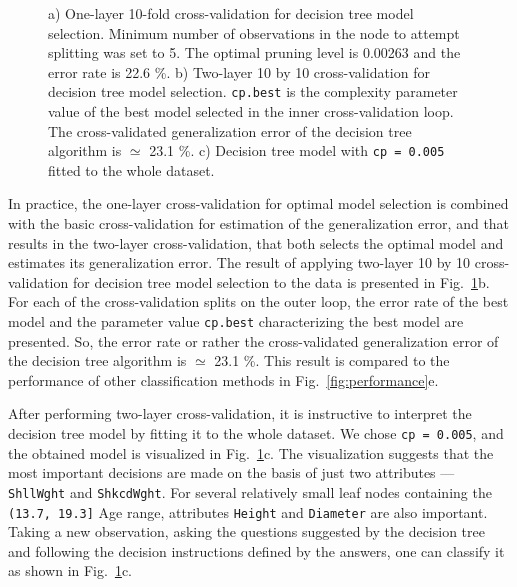 \documentclass[10pt, paper=a4]{article}
\begin{document}
\begin{figure}[h!]
\begin{minipage}{0.99\textwidth}
  \end{minipage} \vfill
  \cprotect\caption{a) One-layer 10-fold cross-validation for decision
    tree model selection.  Minimum number of observations in the node
    to attempt splitting was set to 5.  The optimal pruning level is
    0.00263 and the error rate is 22.6 \%.  b) Two-layer 10 by 10
    cross-validation for decision tree model selection.
    \verb|cp.best| is the complexity parameter value of the best model
    selected in the inner cross-validation loop.  The cross-validated
    generalization error of the decision tree algorithm is $\simeq$
    23.1 \%.  c) Decision tree model with \verb|cp = 0.005| fitted to
    the whole dataset.}
  \label{fig:decision_trees}
\end{figure}

In practice, the one-layer cross-validation for optimal model
selection is combined with the basic cross-validation for estimation
of the generalization error, and that results in the two-layer
cross-validation, that both selects the optimal model and estimates
its generalization error.  The result of applying two-layer 10 by 10
cross-validation for decision tree model selection to the data is
presented in Fig.~\ref{fig:decision_trees}b.  For each of the
cross-validation splits on the outer loop, the error rate of the best
model and the parameter value \verb|cp.best| characterizing the best
model are presented.  So, the error rate or rather the cross-validated
generalization error of the decision tree algorithm is $\simeq$ 23.1
\%.  This result is compared to the performance of other
classification methods in Fig.~\ref{fig:performance}e.

After performing two-layer cross-validation, it is instructive to
interpret the decision tree model by fitting it to the whole dataset.
We chose \verb|cp = 0.005|, and the obtained model is visualized in
Fig.~\ref{fig:decision_trees}c.  The visualization suggests that the
most important decisions are made on the basis of just two attributes
--- \verb|ShllWght| and \verb|ShkcdWght|.  For several relatively
small leaf nodes containing the \verb|(13.7, 19.3]| Age range,
attributes \verb|Height| and \verb|Diameter| are also important.
Taking a new observation, asking the questions suggested by the
decision tree and following the decision instructions defined by the
answers, one can classify it as shown in
Fig.~\ref{fig:decision_trees}c.
\end{document}
